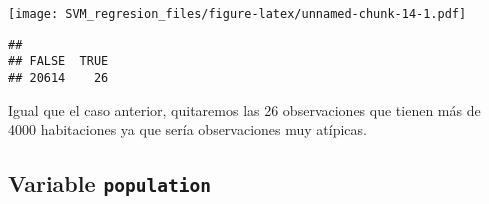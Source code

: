 \documentclass[
]{article}
\newenvironment{Shaded}{\begin{snugshade}}{\end{snugshade}}
\newcommand{\DecValTok}[1]{\textcolor[rgb]{0.00,0.00,0.81}{#1}}
\newcommand{\KeywordTok}[1]{\textcolor[rgb]{0.13,0.29,0.53}{\textbf{#1}}}
\newcommand{\NormalTok}[1]{#1}
\newcommand{\OperatorTok}[1]{\textcolor[rgb]{0.81,0.36,0.00}{\textbf{#1}}}
\newcommand{\StringTok}[1]{\textcolor[rgb]{0.31,0.60,0.02}{#1}}
\begin{document}
\texttt{[image: SVM\_regresion\_files/figure-latex/unnamed-chunk-14-1.pdf]}

\begin{Shaded}
\end{Shaded}

\begin{verbatim}
## 
## FALSE  TRUE 
## 20614    26
\end{verbatim}

Igual que el caso anterior, quitaremos las 26 observaciones que tienen
más de 4000 habitaciones ya que sería observaciones muy atípicas.

\begin{Shaded}
\end{Shaded}

\hypertarget{variable-population}{%
\subsection{\texorpdfstring{Variable
\texttt{population}}{Variable population}}\label{variable-population}}
\end{document}
